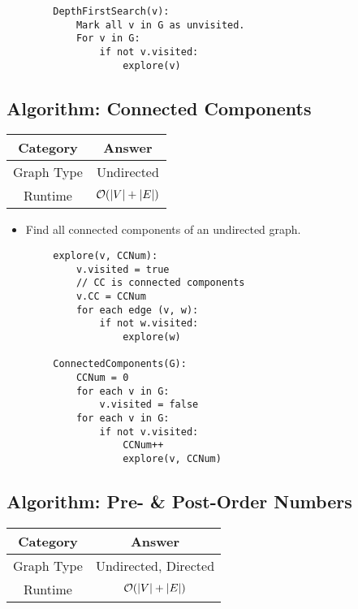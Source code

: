 \documentclass[letterpaper]{article}
\begin{document}
\begin{mdframed}[]
    \begin{verbatim}
        DepthFirstSearch(v):
            Mark all v in G as unvisited. 
            For v in G:
                if not v.visited:
                    explore(v)\end{verbatim}
\end{mdframed}


\subsection{Algorithm: Connected Components}
\begin{center}
    \begin{tabular}{|c|c|}
        \hline 
        \textbf{Category} & \textbf{Answer} \\ 
        \hline 
        Graph Type & Undirected \\ 
        Runtime & $\mathcal{O}(|V| + |E|)$ \\ 
        \hline 
    \end{tabular}
\end{center}

\begin{itemize}
    \item Find all connected components of an undirected graph. 
\end{itemize}

\begin{mdframed}[]
    \begin{verbatim}
        explore(v, CCNum):
            v.visited = true 
            // CC is connected components
            v.CC = CCNum 
            for each edge (v, w):
                if not w.visited: 
                    explore(w)
    
        ConnectedComponents(G):
            CCNum = 0
            for each v in G:
                v.visited = false
            for each v in G: 
                if not v.visited: 
                    CCNum++
                    explore(v, CCNum)\end{verbatim}
\end{mdframed}


\subsection{Algorithm: Pre- \& Post-Order Numbers}
\begin{center}
    \begin{tabular}{|c|c|}
        \hline 
        \textbf{Category} & \textbf{Answer} \\ 
        \hline 
        Graph Type & Undirected, Directed \\ 
        Runtime & $\mathcal{O}(|V| + |E|)$ \\ 
        \hline 
    \end{tabular}
\end{center}
\end{document}
